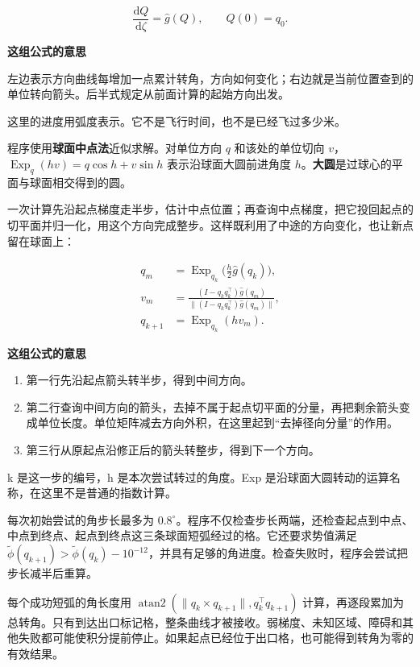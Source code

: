 \documentclass[12pt,a4paper]{article}
\numberwithin{equation}{topic}
\begin{document}
\begin{equation}
\label{eq:ode}
\frac{\mathrm dQ}{\mathrm d\zeta}=\hat g(Q),
\qquad Q(0)=q_0.
\end{equation}

\noindent\textbf{这组公式的意思}\par\nobreak
左边表示方向曲线每增加一点累计转角，方向如何变化；右边就是当前位置查到的单位转向箭头。后半式规定从前面计算的起始方向出发。

这里的进度用弧度表示。它不是飞行时间，也不是已经飞过多少米。


程序使用\textbf{球面中点法}近似求解。对单位方向 \(q\) 和该处的单位切向 \(v\)，\(\operatorname{Exp}_q(hv)=q\cos h+v\sin h\) 表示沿球面大圆前进角度 \(h\)。\textbf{大圆}是过球心的平面与球面相交得到的圆。

一次计算先沿起点梯度走半步，估计中点位置；再查询中点梯度，把它投回起点的切平面并归一化，用这个方向完成整步。这样既利用了中途的方向变化，也让新点留在球面上：

\begin{equation}
\label{eq:midpoint}
\begin{aligned}
q_m&=\operatorname{Exp}_{q_k}\bigl(\tfrac h2\hat g(q_k)\bigr),\\
v_m&=\frac{(I-q_kq_k^\top)\hat g(q_m)}
           {\|(I-q_kq_k^\top)\hat g(q_m)\|},\\
q_{k+1}&=\operatorname{Exp}_{q_k}(h v_m).
\end{aligned}
\end{equation}

\noindent\textbf{这组公式的意思}\par\nobreak
\begin{enumerate}
\item 第一行先沿起点箭头转半步，得到中间方向。
\item 第二行查询中间方向的箭头，去掉不属于起点切平面的分量，再把剩余箭头变成单位长度。单位矩阵减去方向外积，在这里起到“去掉径向分量”的作用。
\item 第三行从原起点沿修正后的箭头转整步，得到下一个方向。
\end{enumerate}
k 是这一步的编号，h 是本次尝试转过的角度。Exp 是沿球面大圆转动的运算名称，在这里不是普通的指数计算。


每次初始尝试的角步长最多为 \(0.8^\circ\)。程序不仅检查步长两端，还检查起点到中点、中点到终点、起点到终点这三条球面短弧经过的格。它还要求势值满足 \(\tilde\phi(q_{k+1})>\tilde\phi(q_k)-10^{-12}\)，并具有足够的角进度。检查失败时，程序会尝试把步长减半后重算。

每个成功短弧的角长度用 \(\operatorname{atan2}(\|q_k\times q_{k+1}\|,q_k^\top q_{k+1})\) 计算，再逐段累加为总转角。只有到达出口标记格，整条曲线才被接收。弱梯度、未知区域、障碍和其他失败都可能使积分提前停止。如果起点已经位于出口格，也可能得到转角为零的有效结果。
\end{document}
